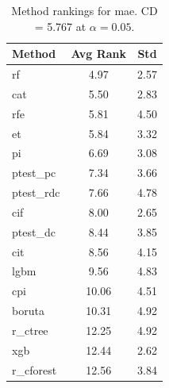 \begin{table}[h]
\centering
\caption{Method rankings for mae. CD = 5.767 at $\alpha=0.05$.}
\label{tab:ranks_mae}
\begin{tabular}{lcc}
\toprule
Method & Avg Rank & Std \\
\midrule
rf & 4.97 & 2.57 \\
cat & 5.50 & 2.83 \\
rfe & 5.81 & 4.50 \\
et & 5.84 & 3.32 \\
pi & 6.69 & 3.08 \\
ptest_pc & 7.34 & 3.66 \\
ptest_rdc & 7.66 & 4.78 \\
cif & 8.00 & 2.65 \\
ptest_dc & 8.44 & 3.85 \\
cit & 8.56 & 4.15 \\
lgbm & 9.56 & 4.83 \\
cpi & 10.06 & 4.51 \\
boruta & 10.31 & 4.92 \\
r_ctree & 12.25 & 4.92 \\
xgb & 12.44 & 2.62 \\
r_cforest & 12.56 & 3.84 \\
\bottomrule
\end{tabular}
\end{table}